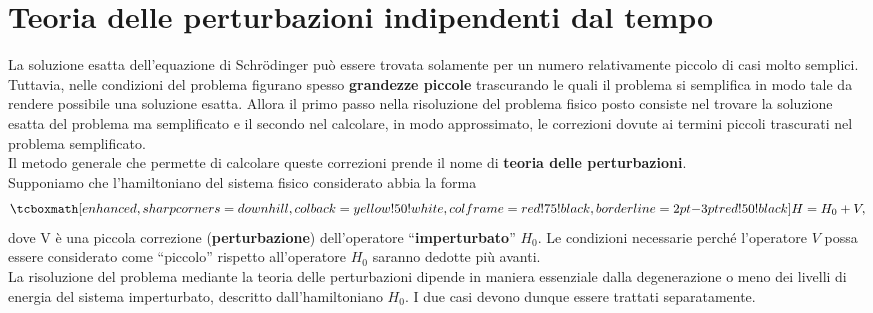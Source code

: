\pagestyle{VS}
\chapter[T.d.P. indipendenti dal tempo]{Teoria delle perturbazioni indipendenti dal tempo}
La soluzione esatta dell'equazione di Schr\"{o}dinger può essere trovata solamente per un numero relativamente piccolo di casi molto semplici.\\

Tuttavia, nelle condizioni del problema figurano spesso \textbf{grandezze piccole} trascurando le quali il problema si semplifica in modo tale da rendere possibile una soluzione esatta. Allora il primo passo nella risoluzione del problema fisico posto consiste nel trovare la soluzione esatta del problema ma semplificato e il secondo nel calcolare, in modo approssimato, le correzioni dovute ai termini piccoli trascurati nel problema semplificato.\\

Il metodo generale che permette di calcolare queste correzioni prende il nome di \textbf{teoria delle perturbazioni}.\\

Supponiamo che l'hamiltoniano del sistema fisico considerato abbia la forma
	\begin{equation}
		\tcboxmath[enhanced, sharp corners=downhill, colback=yellow!50!white, colframe=red!75!black, borderline={2pt}{-3pt}{red!50!black}]{
			H= H_0+ V,
			}
	\end{equation}
dove V è una piccola correzione (\textbf{perturbazione}) dell'operatore ``\textbf{imperturbato}'' $H_0$. Le condizioni necessarie perché l'operatore $V$ possa essere considerato come ``piccolo'' rispetto all'operatore $H_0$ saranno dedotte più avanti.\\

La risoluzione del problema mediante la teoria delle perturbazioni dipende in maniera essenziale dalla degenerazione o meno dei livelli di energia del sistema imperturbato, descritto dall'hamiltoniano $H_0$. I due casi devono dunque essere trattati separatamente.
